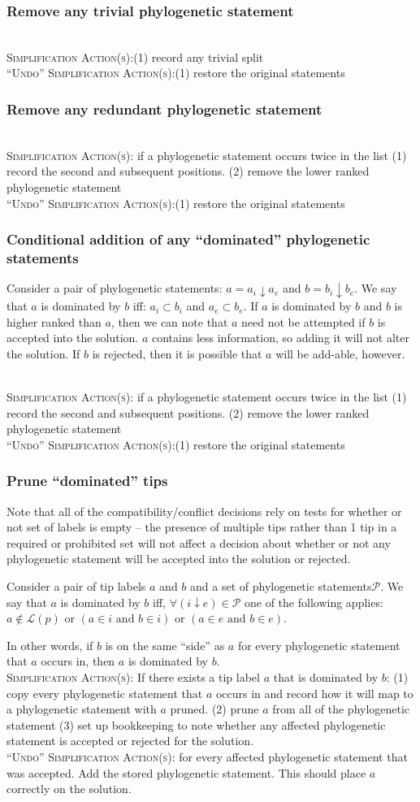 \documentclass[11pt]{article}
\newcommand{\ps}{phylogenetic statement\xspace}
\newcommand{\pss}{phylogenetic statements\xspace}
\newcommand{\simplification}[0]{\\\noindent\textsc{Simplification Action(s)}:\xspace}
\newcommand{\undoActions}[0]{\\\noindent\textsc{``Undo'' Simplification Action(s)}:\xspace}
\newcommand{\leafLabels}[1]{\ensuremath{\mathcal{L}(#1)}}
\newcommand{\vvps}[2]{\ensuremath{{#1}\downarrow{#2}}}
\begin{document}
\subsubsection{Remove any trivial \ps}
\simplification (1) record any trivial split
\undoActions (1) restore the original statements

\subsubsection{Remove any redundant \ps}
\simplification if a \ps occurs twice in the list (1) record the second and subsequent positions. (2) remove the lower ranked \ps
\undoActions (1) restore the original statements

\subsubsection{Conditional addition of any ``dominated'' \pss}
Consider a pair of \pss: $a=\vvps{a_i}{a_e}$ and $b=\vvps{b_i}{b_e}$.
We say that $a$ is dominated by $b$ iff: 
    $a_i \subset b_i$ and $a_e\subset b_e$.
If $a$ is dominated by $b$ and $b$ is higher ranked than $a$, then we can 
    note that $a$ need not be attempted if $b$ is accepted into the solution.
$a$ contains less information, so adding it will not alter the solution.
If $b$ is rejected, then it is possible that $a$ will be add-able, however.


\simplification if a \ps occurs twice in the list (1) record the second and subsequent positions. (2) remove the lower ranked \ps
\undoActions (1) restore the original statements

\subsubsection{Prune ``dominated'' tips}
Note that all of the compatibility/conflict decisions rely on tests for whether or not
    set of labels is empty -- the presence of multiple tips rather than 1 tip in a
    required or prohibited set will not affect a decision about whether or not any
    \ps will be accepted into the solution or rejected.

Consider a pair of tip labels $a$ and $b$ and a set of \pss $\mathcal{P}$.
We say that $a$ is dominated by $b$ iff, $\forall (\vvps{i}{e}) \in \mathcal{P}$ one of the 
    following applies:
    $a\notin \leafLabels{p}$
    or $(a \in i \mbox{ and } b \in i)$
    or $(a \in e \mbox{ and } b \in e)$.

In other words, if $b$ is on the same ``side'' as $a$ for every \ps that $a$ occurs in, then
 $a$ is dominated by $b$.
 \simplification  If there exists a tip label $a$ that is dominated by $b$:
    (1) copy every \ps that $a$ occurs in and record how it will map to a \ps with $a$ pruned.
    (2) prune $a$ from all of the \ps
    (3) set up bookkeeping to note whether any affected \ps is accepted or rejected for the solution.
\undoActions for every affected \ps that was accepted. Add the stored \ps. This should place $a$ correctly on the solution.
\end{document}
